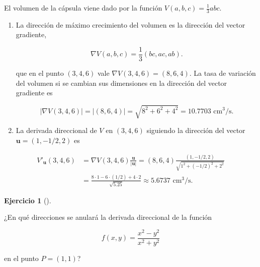 \documentclass[
  spanish,
  a4paper,
]{scrreport}
\theoremstyle{definition}
\newtheorem{exercise}{Ejercicio}[chapter]
\theoremstyle{remark}
\begin{document}
\begin{tcolorbox}[enhanced jigsaw, arc=.35mm, bottomrule=.15mm, bottomtitle=1mm, breakable, colback=white, colbacktitle=quarto-callout-tip-color!10!white, colframe=quarto-callout-tip-color-frame, coltitle=black, left=2mm, leftrule=.75mm, opacityback=0, opacitybacktitle=0.6, rightrule=.15mm, title=\textcolor{quarto-callout-tip-color}{\faLightbulb}\hspace{0.5em}{Solución}, titlerule=0mm, toprule=.15mm, toptitle=1mm]

El volumen de la cápsula viene dado por la función
\(V(a, b, c) = \frac{1}{3}abc\).

\begin{enumerate}
\def\labelenumi{\alph{enumi}.}
\item
  La dirección de máximo crecimiento del volumen es la dirección del
  vector gradiente,

  \[
   \nabla V(a,b,c) = \frac{1}{3}(bc, ac, ab).
   \]

  que en el punto \((3, 4, 6)\) vale \(\nabla V(3,4,6) = (8,6,4)\). La
  tasa de variación del volumen si se cambian sus dimensiones en la
  dirección del vector gradiente es

  \[
   |\nabla V(3,4,6)| = |(8,6,4)| = \sqrt{8^2+6^2+4^2} = 10.7703 \mbox{ cm$^3$/s}.
   \]
\item
  La derivada direccional de \(V\) en \((3,4,6)\) siguiendo la dirección
  del vector \(\mathbf{u}=(1,-1/2,2)\) es
\end{enumerate}

\begin{align*}
V'_\mathbf{u}(3,4,6)
&= \nabla V(3,4,6) \frac{\mathbf{u}}{|\mathbf{u}|}
= (8,6,4)\frac{(1,-1/2,2)}{\sqrt{1^2+(-1/2)^2+2^2}} \\
&= \frac{8\cdot 1 - 6 \cdot (1/2) + 4\cdot 2}{\sqrt{5.25}}
\approx 5.6737 \mbox{ cm$^3$/s}.
\end{align*}

\end{tcolorbox}

\begin{exercise}[]\protect\hypertarget{exr-derivada-direccional-nula}{}\label{exr-derivada-direccional-nula}

¿En qué direcciones se anulará la derivada direccional de la función

\[
f(x,y)=\frac{x^2-y^2}{x^2+y^2}
\]

en el punto \(P=(1,1)\)?

\end{exercise}
\end{document}
